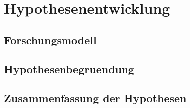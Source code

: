 \chapter{Hypothesenentwicklung}\label{chap:hypothesen}

\section{Forschungsmodell}\label{sec:modell}

\section{Hypothesenbegruendung}\label{sec:hypbegruendung}


\section{Zusammenfassung der Hypothesen}\label{sec:hypotheses-summary}

